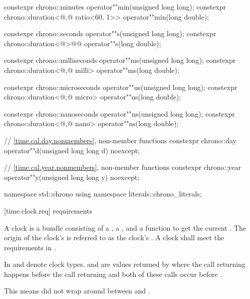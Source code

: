 \begin{codeblock}
{  constexpr chrono::minutes                             operator""min(unsigned long long);
  constexpr chrono::duration<@\unspec,@ ratio<60, 1>> operator""min(long double);

  constexpr chrono::seconds               operator""s(unsigned long long);
  constexpr chrono::duration<@\unspec@>@\itcorr[-1]@ operator""s(long double);

  constexpr chrono::milliseconds                 operator""ms(unsigned long long);
  constexpr chrono::duration<@\unspec,@ milli> operator""ms(long double);

  constexpr chrono::microseconds                 operator""us(unsigned long long);
  constexpr chrono::duration<@\unspec,@ micro> operator""us(long double);

  constexpr chrono::nanoseconds                 operator""ns(unsigned long long);
  constexpr chrono::duration<@\unspec,@ nano> operator""ns(long double);

  // \ref{time.cal.day.nonmembers}, non-member functions
  constexpr chrono::day  operator""d(unsigned long long d) noexcept;

  // \ref{time.cal.year.nonmembers}, non-member functions
  constexpr chrono::year operator""y(unsigned long long y) noexcept;
}

namespace std::chrono {
  using namespace literals::chrono_literals;
}
\end{codeblock}

[time.clock.req]{ requirements}

%
\pnum
A clock is a bundle consisting of a , a
, and a function  to get the current .
The origin of the clock's  is referred to as the clock's .
 A clock shall meet the requirements in .

\pnum
In   and  denote clock types.  and
 are values returned by  where the call returning  happens
before the call returning  and both of these calls
occur
before .
\begin{note}
This means  did not wrap around between  and
.
\end{note}

